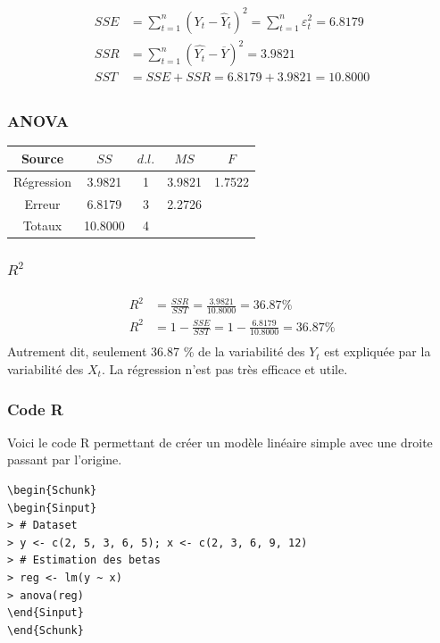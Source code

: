 \documentclass[11pt,french]{report}
\begin{document}
\begin{align*}
SSE &= \displaystyle\sum_{t=1}^n (Y_t - \hat{Y}_t)^2 = \displaystyle\sum_{t=1}^n \varepsilon_t^2 = 6.8179 \\
SSR &= \displaystyle\sum_{t=1}^n (\hat{Y_t} - \overline{Y})^2 = 3.9821 \\
SST &= SSE + SSR = 6.8179 +3.9821 = 10.8000 \\
\end{align*}

\subsubsection*{ANOVA}
\begin{center}
\begin{tabular}{|c|c|c|c|c|}
\hline
\rowcolor{backcolour}
Source & $SS$ & $d.l.$ & $MS$ & $F$ \\
\hline
Régression & 3.9821 & 1 & 3.9821 & 1.7522 \\
Erreur & 6.8179 & 3 & 2.2726 & \\
\hline
Totaux & 10.8000 & 4 & & \\
\hline
\end{tabular}
\end{center}

\subsubsection*{\textbf{$R^2$}}
\begin{align*}
R^2 &= \frac{SSR}{SST} = \frac{3.9821}{10.8000} = 36.87 \% \\
R^2 &= 1 - \frac{SSE}{SST} = 1 - \frac{6.8179}{10.8000} = 36.87 \% \\
\end{align*}
Autrement dit, seulement 36.87 \% de la variabilité des $Y_t$ est expliquée par la variabilité des $X_t$. La régression n'est pas très efficace et utile.

\subsubsection*{Code R}
Voici le code R permettant de créer un modèle linéaire simple avec une droite passant par l'origine.

\begin{lstlisting}[linerange=\\begin\{Sinput\}-\\end\{Sinput\},includerangemarker=false, caption = Code source en R pour l'exemple]
\begin{Schunk}
\begin{Sinput}
> # Dataset
> y <- c(2, 5, 3, 6, 5); x <- c(2, 3, 6, 9, 12)
> # Estimation des betas
> reg <- lm(y ~ x)
> anova(reg)
\end{Sinput}
\end{Schunk}
\end{lstlisting}
\bigskip
\end{document}

